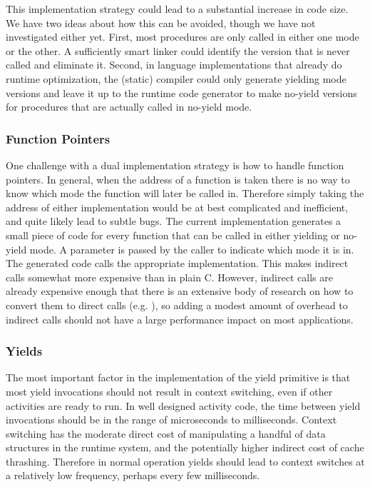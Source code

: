 \documentclass[9pt,preprint]{sigplanconf}
\begin{document}
This implementation strategy could lead to a substantial increase in code size.
We have two ideas about how this can be avoided, though we have not investigated either yet.
First, most procedures are only called in either one mode or the other.
A sufficiently smart linker could identify the version that is never called and eliminate it.
Second, in language implementations that already do runtime optimization, the (static) compiler could only generate yielding mode versions and leave it up to the runtime code generator to make no-yield versions for procedures that are actually called in no-yield mode.


\subsubsection{Function Pointers}

One challenge with a dual implementation strategy is how to handle function pointers.
In general, when the address of a function is taken there is no way to know which mode the function will later be called in.
Therefore simply taking the address of either implementation would be at best complicated and inefficient, and quite likely lead to subtle bugs.
The current implementation generates a small piece of code for every function that can be called in either yielding or no-yield mode.
A parameter is passed by the caller to indicate which mode it is in.
The generated code calls the appropriate implementation.
This makes indirect calls somewhat more expensive than in plain C.
However, indirect calls are already expensive enough that there is an extensive body of research on how to convert them to direct calls (e.g. \cite{Dean1995}), so adding a modest amount of overhead to indirect calls should not have a large performance impact on most applications.

\subsubsection{Yields}

The most important factor in the implementation of the yield primitive is that most yield invocations should not result in context switching, even if other activities are ready to run.
In well designed activity code, the time between yield invocations should be in the range of microseconds to milliseconds.
Context switching has the moderate direct cost of manipulating a handful of data structures in the runtime system, and the potentially higher indirect cost of cache thrashing.
Therefore in normal operation yields should lead to context switches at a relatively low frequency, perhaps every few milliseconds.
\end{document}
